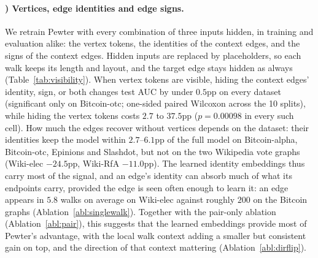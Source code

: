 \documentclass[sigconf]{acmart}
\newcounter{ablation}
\renewcommand{\theablation}{\Alph{ablation}}
\theoremstyle{plain}
\theoremstyle{definition}
\begin{document}
\paragraph{\theablation) Vertices, edge identities and edge signs.}
\label{abl:visibility}
We retrain Pewter with every combination of three inputs hidden, in training and evaluation alike: the vertex tokens, the identities of the context edges, and the signs of the context edges. Hidden inputs are replaced by placeholders, so each walk keeps its length and layout, and the target edge stays hidden as always (Table~\ref{tab:visibility}). When vertex tokens are visible, hiding the context edges' identity, sign, or both changes test AUC by under $0.5$pp on every dataset (significant only on Bitcoin-otc; one-sided paired Wilcoxon across the 10 splits), while hiding the vertex tokens costs $2.7$ to $37.5$pp ($p=0.00098$ in every such cell). How much the edges recover without vertices depends on the dataset: their identities keep the model within $2.7$--$6.1$pp of the full model on Bitcoin-alpha, Bitcoin-otc, Epinions and Slashdot, but not on the two Wikipedia vote graphs (Wiki-elec $-24.5$pp, Wiki-RfA $-11.0$pp). The learned identity embeddings thus carry most of the signal, and an edge's identity can absorb much of what its endpoints carry, provided the edge is seen often enough to learn it: an edge appears in $5.8$ walks on average on Wiki-elec against roughly $200$ on the Bitcoin graphs (Ablation~\ref{abl:singlewalk}). Together with the pair-only ablation (Ablation~\ref{abl:pair}), this suggests that the learned embeddings provide most of Pewter's advantage, with the local walk context adding a smaller but consistent gain on top, and the direction of that context mattering (Ablation~\ref{abl:dirflip}).
\end{document}
